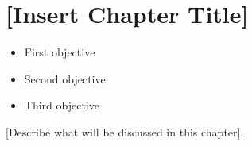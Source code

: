 \documentclass[../workbook]{subfiles}
\begin{document}
\chapter{[Insert Chapter Title]}

\begin{chaptertopics}
\end{chaptertopics}

\chapterobjectives

\begin{itemize}
\item First objective
\item Second objective
\item Third objective
\end{itemize}

\chapteroverview

[Describe what will be discussed in this chapter].
\end{document}

